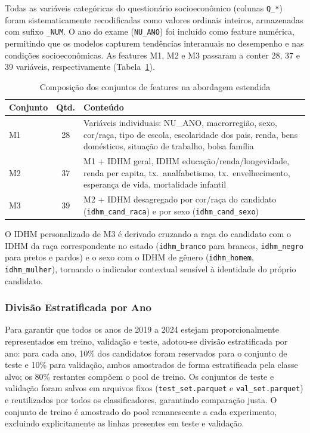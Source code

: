 \documentclass[12pt]{article}
\begin{document}
Todas as variáveis categóricas do questionário socioeconômico (colunas
\texttt{Q\_*}) foram sistematicamente recodificadas como valores
ordinais inteiros, armazenadas com sufixo \texttt{\_NUM}. O ano do exame
(\texttt{NU\_ANO}) foi incluído como feature numérica, permitindo que os
modelos capturem tendências interanuais no desempenho e nas condições
socioeconômicas. As features M1, M2 e M3 passaram a conter 28, 37 e 39
variáveis, respectivamente (Tabela~\ref{tab:features}).

\begin{table}[H]
\centering
\caption{Composição dos conjuntos de features na abordagem estendida}
\label{tab:features}
\small
\begin{tabular}{lcp{8cm}}
\toprule
\textbf{Conjunto} & \textbf{Qtd.} & \textbf{Conteúdo} \\
\midrule
M1 & 28 & Variáveis individuais: NU\_ANO, macrorregião, sexo, cor/raça,
           tipo de escola, escolaridade dos pais, renda, bens domésticos,
           situação de trabalho, bolsa família \\
M2 & 37 & M1 + IDHM geral, IDHM educação/renda/longevidade, renda per
           capita, tx.\ analfabetismo, tx.\ envelhecimento, esperança de
           vida, mortalidade infantil \\
M3 & 39 & M2 + IDHM desagregado por cor/raça do candidato
           (\texttt{idhm\_cand\_raca}) e por sexo
           (\texttt{idhm\_cand\_sexo}) \\
\bottomrule
\end{tabular}
\end{table}

O IDHM personalizado de M3 é derivado cruzando a raça do candidato com
o IDHM da raça correspondente no estado (\texttt{idhm\_branco} para
brancos, \texttt{idhm\_negro} para pretos e pardos) e o sexo com o IDHM
de gênero (\texttt{idhm\_homem}, \texttt{idhm\_mulher}), tornando o
indicador contextual sensível à identidade do próprio candidato.

\subsubsection{Divisão Estratificada por Ano}

Para garantir que todos os anos de 2019 a 2024 estejam proporcionalmente
representados em treino, validação e teste, adotou-se divisão
estratificada por ano: para cada ano, 10\% dos candidatos foram
reservados para o conjunto de teste e 10\% para validação, ambos
amostrados de forma estratificada pela classe alvo; os 80\% restantes
compõem o pool de treino. Os conjuntos de teste e validação foram salvos
em arquivos fixos (\texttt{test\_set.parquet} e \texttt{val\_set.parquet})
e reutilizados por todos os classificadores, garantindo comparação justa.
O conjunto de treino é amostrado do pool remanescente a cada experimento,
excluindo explicitamente as linhas presentes em teste e validação.
\end{document}
